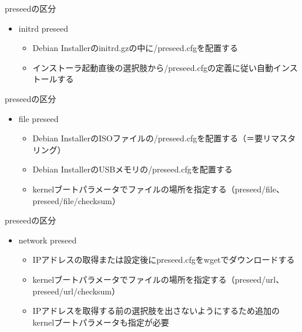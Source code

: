 \begin{frame}[containsverbatim]{preseedの区分}
  \begin{itemize}
  \item initrd preseed
    \begin{itemize}
    \item Debian Installerのinitrd.gzの中に/preseed.cfgを配置する
    \item インストーラ起動直後の選択肢から/preseed.cfgの定義に従い自動インストールする
    \end{itemize}
  \end{itemize}
\end{frame}

\begin{frame}[containsverbatim]{preseedの区分}
  \begin{itemize}
  \item file preseed
  \begin{itemize}
    \item Debian InstallerのISOファイルの/preseed.cfgを配置する（＝要リマスタリング）
    \item Debian InstallerのUSBメモリの/preseed.cfgを配置する
    \item kernelブートパラメータでファイルの場所を指定する（preseed/file、preseed/file/checksum）
    \end{itemize}
  \end{itemize}
\end{frame}

\begin{frame}[containsverbatim]{preseedの区分}
  \begin{itemize}
  \item network preseed
    \begin{itemize}
    \item IPアドレスの取得または設定後にpreseed.cfgをwgetでダウンロードする
    \item kernelブートパラメータでファイルの場所を指定する（preseed/url、preseed/url/checksum）
    \item IPアドレスを取得する前の選択肢を出さないようにするため追加のkernelブートパラメータも指定が必要
    \end{itemize}
  \end{itemize}
\end{frame}

